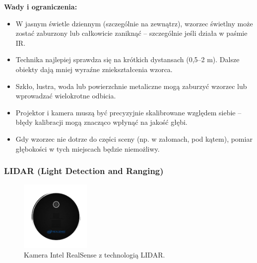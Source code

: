 \documentclass[magisterska]{pracadypl}
\begin{document}
\begin{minipage}[t]{\textwidth}
\textbf{Wady i ograniczenia:}
\begin{itemize}
  \item W jasnym świetle dziennym (szczególnie na zewnątrz), wzorzec świetlny może zostać zaburzony lub całkowicie zaniknąć – szczególnie jeśli działa w paśmie IR.

  \item Technika najlepiej sprawdza się na krótkich dystansach (0,5–2 m). Dalsze obiekty dają mniej wyraźne zniekształcenia wzorca.

  \item Szkło, lustra, woda lub powierzchnie metaliczne mogą zaburzyć wzorzec lub wprowadzać wielokrotne odbicia.

  \item Projektor i kamera muszą być precyzyjnie skalibrowane względem siebie – błędy kalibracji mogą znacząco wpłynąć na jakość głębi.

  \item Gdy wzorzec nie dotrze do części sceny (np. w załomach, pod kątem), pomiar głębokości w tych miejscach będzie niemożliwy.
\end{itemize}
\end{minipage}

\subsubsection*{LIDAR (Light Detection and Ranging)}

\begin{figure}[H]  %
    \centering  %
    \includegraphics[width=0.3\textwidth]{images/LIDAR.png}  %
    \captionsetup{font=footnotesize}
    \caption[Kamera Intel RealSense L515 z technologią LIDAR. https://cell-kom.com/inne/21454-kamera-internetowa-full-hd-b16-1080p-5900217390350.html]{Kamera Intel RealSense z technologią LIDAR.}
    \label{fig:mono}  %
\end{figure}
\end{document}
